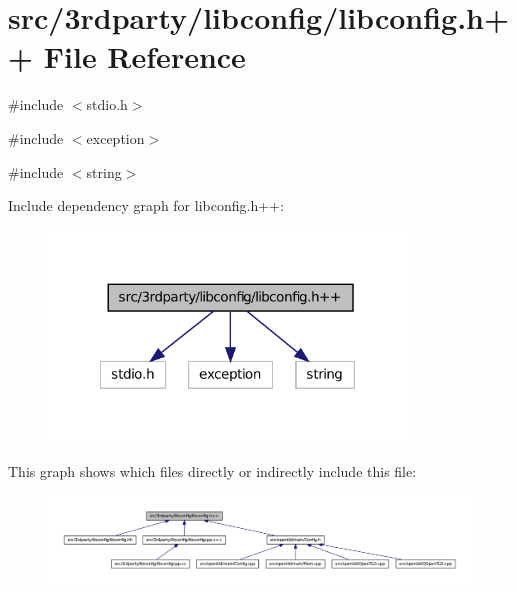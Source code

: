 \hypertarget{libconfig_8h_09_09}{
\section{src/3rdparty/libconfig/libconfig.h++ File Reference}
\label{libconfig_8h_09_09}
}
{\ttfamily \#include $<$stdio.h$>$}\par
{\ttfamily \#include $<$exception$>$}\par
{\ttfamily \#include $<$string$>$}\par
Include dependency graph for libconfig.h++:
\nopagebreak
\begin{figure}[H]
\begin{center}
\leavevmode
\includegraphics[width=270pt]{libconfig_8h_09_09__incl}
\end{center}
\end{figure}
This graph shows which files directly or indirectly include this file:
\nopagebreak
\begin{figure}[H]
\begin{center}
\leavevmode
\includegraphics[width=400pt]{libconfig_8h_09_09__dep__incl}
\end{center}
\end{figure}
